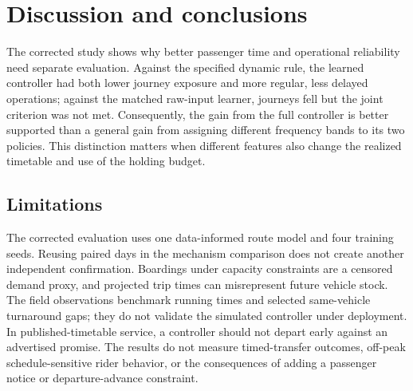 \section{Discussion and conclusions}

The corrected study shows why better passenger time and operational reliability need separate evaluation. Against the specified dynamic rule, the learned controller had both lower journey exposure and more regular, less delayed operations; against the matched raw-input learner, journeys fell but the joint criterion was not met. Consequently, the gain from the full controller is better supported than a general gain from assigning different frequency bands to its two policies. This distinction matters when different features also change the realized timetable and use of the holding budget.



\subsection{Limitations}
The corrected evaluation uses one data-informed route model and four training seeds. Reusing paired days in the mechanism comparison does not create another independent confirmation. Boardings under capacity constraints are a censored demand proxy, and projected trip times can misrepresent future vehicle stock. The field observations benchmark running times and selected same-vehicle turnaround gaps; they do not validate the simulated controller under deployment. In published-timetable service, a controller should not depart early against an advertised promise. The results do not measure timed-transfer outcomes, off-peak schedule-sensitive rider behavior, or the consequences of adding a passenger notice or departure-advance constraint.
